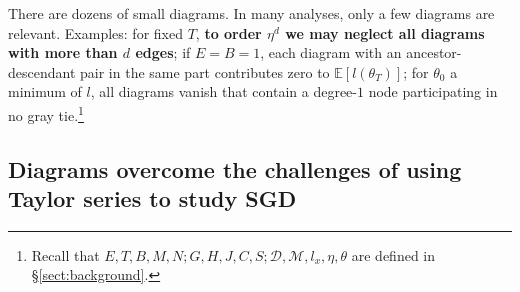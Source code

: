 \documentclass[anon,12pt]{colt2021} %
\newcommand{\expc}{\mathbb{E}}
\newcommand{\Dd}{\mathcal{D}}
\newcommand{\Mm}{\mathcal{M}}
\begin{document}
            There are dozens of small diagrams.  In many analyses, only a few
            diagrams are relevant.  Examples: for fixed $T$, \textbf{to order
            $\eta^d$ we may neglect all diagrams with more than $d$ edges};
            if $E=B=1$, each diagram with an ancestor-descendant pair in the
            same part contributes zero to $\expc[l(\theta_T)]$; for $\theta_0$ a minimum of
            $l$, all diagrams vanish that contain a degree-$1$ node
            participating in no gray tie.\footnote{
                Recall that $E,T,B,M,N;G,H,J,C,S;\Dd,\Mm,l_x,\eta,\theta$
                are defined in \S\ref{sect:background}.
            }

        \subsection{Diagrams overcome the challenges of using Taylor series to study SGD}\label{sect:using}
\end{document}
